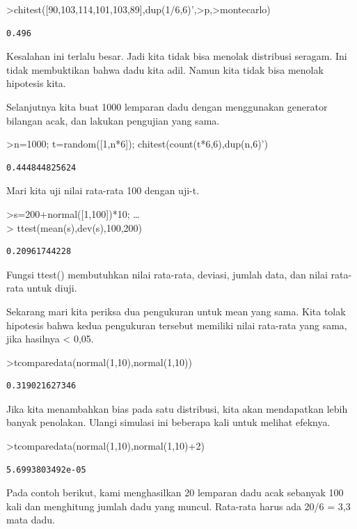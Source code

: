 \documentclass[
]{book}
\begin{document}
\textgreater chitest({[}90,103,114,101,103,89{]},dup(1/6,6)',\textgreater p,\textgreater montecarlo)

\begin{verbatim}
0.496
\end{verbatim}

Kesalahan ini terlalu besar. Jadi kita tidak bisa menolak distribusi seragam. Ini tidak membuktikan bahwa dadu kita adil. Namun kita tidak bisa menolak hipotesis kita.

Selanjutnya kita buat 1000 lemparan dadu dengan menggunakan generator bilangan acak, dan lakukan pengujian yang sama.

\textgreater n=1000; t=random({[}1,n*6{]}); chitest(count(t*6,6),dup(n,6)')

\begin{verbatim}
0.444844825624
\end{verbatim}

Mari kita uji nilai rata-rata 100 dengan uji-t.

\textgreater s=200+normal({[}1,100{]})*10; \ldots{}\\
\textgreater{} ttest(mean(s),dev(s),100,200)

\begin{verbatim}
0.20961744228
\end{verbatim}

Fungsi ttest() membutuhkan nilai rata-rata, deviasi, jumlah data, dan nilai rata-rata untuk diuji.

Sekarang mari kita periksa dua pengukuran untuk mean yang sama. Kita tolak hipotesis bahwa kedua pengukuran tersebut memiliki nilai rata-rata yang sama, jika hasilnya \textless{} 0,05.

\textgreater tcomparedata(normal(1,10),normal(1,10))

\begin{verbatim}
0.319021627346
\end{verbatim}

Jika kita menambahkan bias pada satu distribusi, kita akan mendapatkan lebih banyak penolakan. Ulangi simulasi ini beberapa kali untuk melihat efeknya.

\textgreater tcomparedata(normal(1,10),normal(1,10)+2)

\begin{verbatim}
5.6993803492e-05
\end{verbatim}

Pada contoh berikut, kami menghasilkan 20 lemparan dadu acak sebanyak 100 kali dan menghitung jumlah dadu yang muncul. Rata-rata harus ada 20/6 = 3,3 mata dadu.
\end{document}
